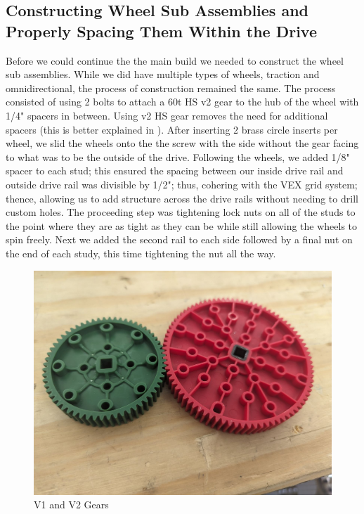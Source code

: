 \subsection*{Constructing Wheel Sub Assemblies and Properly Spacing Them Within the Drive}
Before we could continue the the main build we needed to construct the wheel sub assemblies. While we did have multiple types of wheels, traction and omnidirectional, the process of construction remained the same. The process consisted of using 2 bolts to attach a 60t HS v2 gear to the hub of the wheel with 1/4" spacers in between. Using v2 HS gear removes the need for additional spacers (this is better explained in ). After inserting 2 brass circle inserts per wheel, we slid the wheels onto the the screw with the side without the gear facing to what was to be the outside of the drive. Following the wheels, we added 1/8" spacer to each stud; this ensured the spacing between our inside drive rail and outside drive rail was divisible by 1/2"; thus, cohering with the VEX grid system; thence, allowing us to add structure across the drive rails without needing to drill custom holes. The proceeding step was tightening lock nuts on all of the studs to the point where they are as tight as they can be while still allowing the wheels to spin freely. Next we added the second rail to each side followed by a final nut on the end of each study, this time tightening the nut all the way.
\begin{figure}[h!] %
        \centering
        \includegraphics[width=.8\linewidth]{images/V1 and V2 Gears.jpeg}
        \caption{V1 and V2 Gears}
        \label{fig:v1-and-v2-gears}
\end{figure}


